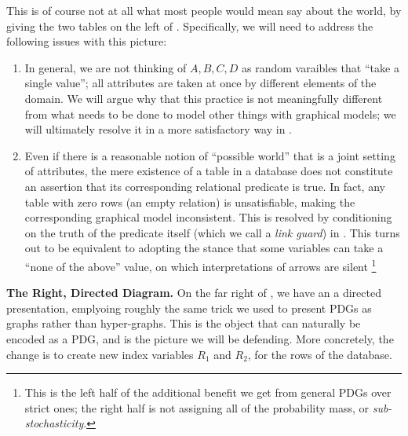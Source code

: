\documentclass{article}
\theoremstyle{definition}
\theoremstyle{remark}
\begin{document}
\begin{example}
    This is of course not at all what most people would mean say about the world, by giving the two tables on the left of . Specifically, we will need to address the following issues with this picture:
    \begin{enumerate}
        \item  In general, we are not thinking of  $A, B, C, D$ as random varaibles that ``take a single value''; all attributes are taken at once by different elements of the domain. We will argue why that this practice is not meaningfully different from what needs to be done to model other things with graphical models; we will ultimately resolve it in a more satisfactory way in .
        \item Even if there is a reasonable notion of ``possible world'' that is a joint setting of attributes, the mere existence of a table in a database does not constitute an assertion that its corresponding relational predicate is true. In fact, any table with zero rows (an empty relation) is unsatisfiable, making the corresponding graphical model inconsistent. This is resolved by conditioning on the truth of the predicate itself (which we call a \emph{link guard}) in . This turns out to be equivalent to adopting the stance that some variables can take a ``none of the above'' value, on which interpretations of arrows are silent%
            \footnote{This is the left half of the additional benefit we get from general PDGs over strict ones; the right half is not assigning all of the probability mass, or \emph{sub-stochasticity}. }
    \end{enumerate}

    

    

    
    \textbf{The Right, Directed Diagram.} On the far right of , we have an a directed presentation, emplyoing roughly the same trick we used to present PDGs as graphs rather than hyper-graphs. This is the object that can naturally be encoded as a PDG, and is the picture we will be defending. More concretely, the change is to create new index variables $R_1$ and $R_2$, for the rows of the database. 
    

\end{example}
\end{document}
